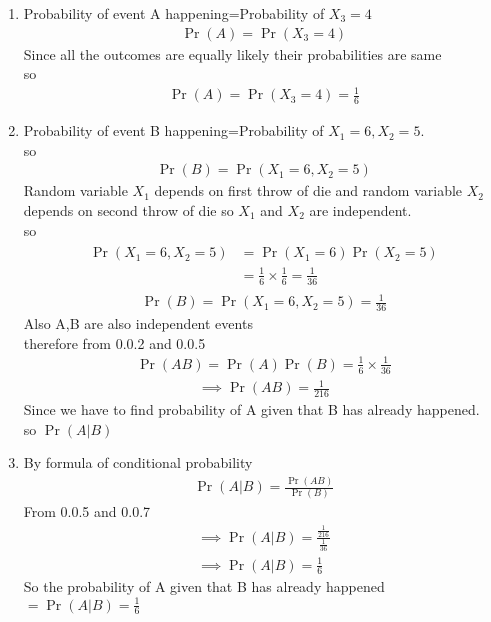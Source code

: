 \documentclass[journal,12pt,twocolumn]{IEEEtran}
\begin{document}
\begin{enumerate}
\item Probability of event A happening=Probability of $X_3=4$
\begin{align}
    \Pr{(A)}=\Pr{(X_3=4)}
\end{align}
Since all the outcomes are equally likely their probabilities are same \\
so
\begin{align}
    \Pr{(A)}=\Pr{(X_3=4)}=\frac{1}{6}
\end{align}
\item Probability of event B happening=Probability of $X_1=6,X_2=5$.\\
so
\begin{align}
    \Pr{(B)}=\Pr{(X_1=6,X_2=5)}
\end{align}
Random variable $X_1$ depends on first throw of die and random variable $X_2$ depends on second throw of die so $X_1$ and $X_2$ are independent.\\
so 
\begin{align}
\begin{split}
    \Pr{(X_1=6,X_2=5)} &=\Pr{(X_1=6)} \Pr{(X_2=5)}\\
   &=\frac{1}{6}\times \frac{1}{6}=\frac{1}{36}
   \end{split}
\end{align}
\begin{align}
    \Pr{(B)}=\Pr{(X_1=6,X_2=5)}=\frac{1}{36}
\end{align}
Also A,B are also independent events \\
therefore  from 0.0.2 and 0.0.5
\begin{align}
    \Pr{(AB)} = \Pr{(A)} \Pr{(B)}
     =\frac{1}{6} \times \frac{1}{36}
    \end{align}
    \begin{align}
 \implies  \Pr{(AB)}=\frac{1}{216}
\end{align}
Since we have to find probability of A given that B has already happened.\\
so $\Pr{(A|B)}$\\
\item By formula of conditional probability
\begin{align}
    \Pr{(A|B)}=\frac{\Pr{(AB)}}{\Pr{(B)}}
    \end{align}
    From 0.0.5 and 0.0.7 
    \begin{align}  
    \implies
    \Pr{(A|B)}=\frac{\frac{1}{216}}{\frac{1}{36}}\\
    \implies
    \Pr{(A|B)}=\frac{1}{6}
    \end{align}
    So the probability of A given that B has already happened $=\Pr{(A|B)}=\frac{1}{6}$
\end{enumerate}
\end{document}
